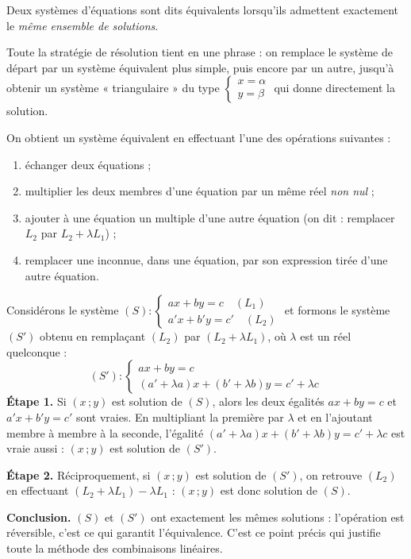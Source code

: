 \documentclass[11pt]{article}
\newcommand{\cle}[1]{{\popxbold\color{popdark}#1}}
\begin{document}
\begin{definition}
Deux systèmes d'équations sont dits \cle{équivalents} lorsqu'ils admettent exactement le \emph{même ensemble de solutions}.
\end{definition}

Toute la stratégie de résolution tient en une phrase : on remplace le système de départ par un système équivalent plus simple, puis encore par un autre, jusqu'à obtenir un système « triangulaire » du type $\begin{cases} x = \alpha \\ y = \beta \end{cases}$ qui donne directement la solution.

\begin{propriete}
On obtient un système équivalent en effectuant l'une des opérations suivantes :
\begin{enumerate}
\item échanger deux équations ;
\item multiplier les deux membres d'une équation par un même réel \emph{non nul} ;
\item ajouter à une équation un multiple d'une autre équation (on dit : remplacer $L_2$ par $L_2 + \lambda L_1$) ;
\item remplacer une inconnue, dans une équation, par son expression tirée d'une autre équation.
\end{enumerate}
\end{propriete}

\begin{experience}
Considérons le système $(S) : \begin{cases} ax + by = c \quad (L_1) \\ a'x + b'y = c' \quad (L_2) \end{cases}$ et formons le système $(S')$ obtenu en remplaçant $(L_2)$ par $(L_2 + \lambda L_1)$, où $\lambda$ est un réel quelconque :
\[
(S') : \begin{cases} ax + by = c \\ (a' + \lambda a)x + (b' + \lambda b)y = c' + \lambda c \end{cases}
\]
\textbf{Étape 1.} Si $(x\,;y)$ est solution de $(S)$, alors les deux égalités $ax+by=c$ et $a'x+b'y=c'$ sont vraies. En multipliant la première par $\lambda$ et en l'ajoutant membre à membre à la seconde, l'égalité $(a'+\lambda a)x + (b'+\lambda b)y = c' + \lambda c$ est vraie aussi : $(x\,;y)$ est solution de $(S')$.

\textbf{Étape 2.} Réciproquement, si $(x\,;y)$ est solution de $(S')$, on retrouve $(L_2)$ en effectuant $(L_2 + \lambda L_1) - \lambda L_1$ : $(x\,;y)$ est donc solution de $(S)$.

\textbf{Conclusion.} $(S)$ et $(S')$ ont exactement les mêmes solutions : l'opération est réversible, c'est ce qui garantit l'équivalence. C'est ce point précis qui justifie toute la méthode des combinaisons linéaires.
\end{experience}
\end{document}
